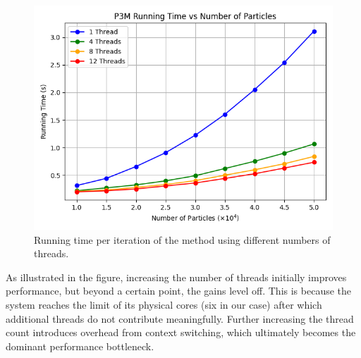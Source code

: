\begin{figure}[htp]
    \centering
    \includegraphics[scale=0.5]{chapters/p3m-method/img/p3m_threads.png}
    \caption{Running time per iteration of the \PThreeM{} method using different numbers of threads.}
    \label{fig:p3m-time-threads}
\end{figure}
As illustrated in the figure, increasing the number of threads initially improves performance, but beyond a certain point, the gains level off.
This is because the system reaches the limit of its physical cores (six in our case) after which additional threads do not contribute meaningfully.
Further increasing the thread count introduces overhead from context switching, which ultimately becomes the dominant performance bottleneck.
